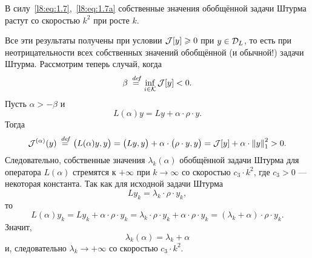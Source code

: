В силу~\eqref{l8:eq:1.7},~\eqref{l8:eq:1.7a} собственные значения обобщённой задачи Штурма растут со скоростью $k^2$ при росте $k$.

%
%

Все эти результаты получены при условии $\mathcal{J}[y]\geqslant0$ при $y\in\mathcal{D}_{L}$, то есть при неотрицательности всех собственных значений обобщённой (и обычной!) задачи Штурма. Рассмотрим теперь случай, когда 
\begin{equation*}
	\beta\stackrel{\hspace{0.09 cm}de\!f}{=}\inf\limits_{i\in\mathcal{K}}\mathcal{J}[y]<0.
\end{equation*} 
Пусть $\alpha>-\beta$ и 
\begin{equation*}
	L(\alpha)y=Ly+\alpha\cdot\rho\cdot y.
\end{equation*}
Тогда 
\begin{equation*}
	\mathcal{J}^{(\alpha)}(y)\stackrel{\hspace{0.09 cm}de\!f}{=}\big(L(\alpha)y,y\big)=\big(Ly,y\big)+\alpha\cdot\big(\rho\cdot y,y\big)=\mathcal{J}[y]+\alpha\cdot\left\|y\right\|_1^2>0.
\end{equation*}
Следовательно, собственные значения $\lambda_k(\alpha)$ обобщённой задачи Штурма для оператора $L(\alpha)$ стремятся к $+\infty$ при $k\to\infty$ со скоростью $c_3\cdot k^2$, где $c_3>0$ --- некоторая константа. Так как для исходной задачи Штурма 
\begin{equation*}
	L y_k=\lambda_k\cdot\rho\cdot y_k,
\end{equation*}
то 
\begin{equation*}
	L(\alpha)y_k=L y_k+\alpha\cdot\rho\cdot y_k=\lambda_k\cdot\rho\cdot y_k+\alpha\cdot\rho\cdot y_k=(\lambda_k+\alpha)\cdot\rho\cdot y_k.
\end{equation*}
Значит,
\begin{equation*}
	\lambda_k(\alpha)=\lambda_k+\alpha
\end{equation*}
и, следовательно $\lambda_k\to+\infty$ со скоростью $c_3\cdot k^2$.

